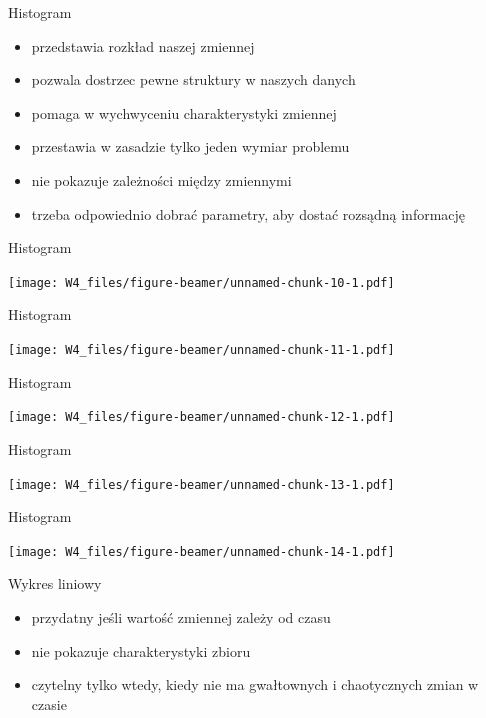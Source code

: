 \documentclass[ignorenonframetext,]{beamer}
\providecommand{\tightlist}{%
\setlength{\itemsep}{0pt}\setlength{\parskip}{0pt}}
\begin{document}
\begin{frame}{Histogram}

\begin{itemize}
\tightlist
\item
  przedstawia rozkład naszej zmiennej
\item
  pozwala dostrzec pewne struktury w naszych danych
\item
  pomaga w wychwyceniu charakterystyki zmiennej
\item
  przestawia w zasadzie tylko jeden wymiar problemu
\item
  nie pokazuje zależności między zmiennymi
\item
  trzeba odpowiednio dobrać parametry, aby dostać rozsądną informację
\end{itemize}

\end{frame}

\begin{frame}{Histogram}

\texttt{[image: W4\_files/figure-beamer/unnamed-chunk-10-1.pdf]}

\end{frame}

\begin{frame}{Histogram}

\texttt{[image: W4\_files/figure-beamer/unnamed-chunk-11-1.pdf]}

\end{frame}

\begin{frame}{Histogram}

\texttt{[image: W4\_files/figure-beamer/unnamed-chunk-12-1.pdf]}

\end{frame}

\begin{frame}{Histogram}

\texttt{[image: W4\_files/figure-beamer/unnamed-chunk-13-1.pdf]}

\end{frame}

\begin{frame}{Histogram}

\texttt{[image: W4\_files/figure-beamer/unnamed-chunk-14-1.pdf]}

\end{frame}

\begin{frame}{Wykres liniowy}

\begin{itemize}
\tightlist
\item
  przydatny jeśli wartość zmiennej zależy od czasu
\item
  nie pokazuje charakterystyki zbioru
\item
  czytelny tylko wtedy, kiedy nie ma gwałtownych i chaotycznych zmian w
  czasie
\end{itemize}

\end{frame}
\end{document}
